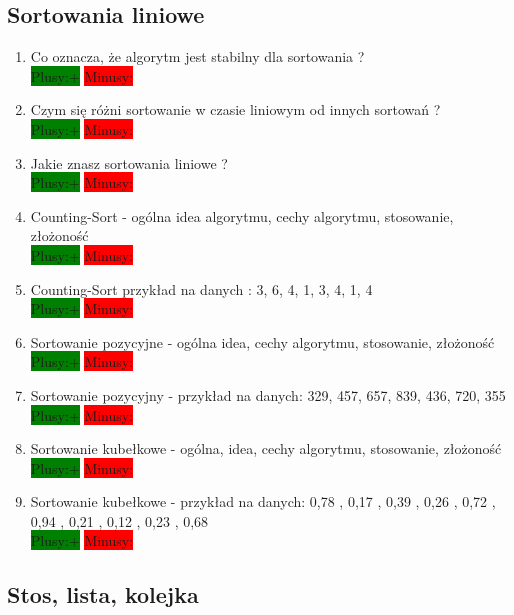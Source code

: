 \documentclass[a4paper,11pt]{article}
\begin{document}
\subsection{Sortowania liniowe}
\begin{enumerate}
\item Co oznacza, że algorytm jest stabilny dla sortowania ? \\ \colorbox{green}{Plusy:+} \colorbox{red}{Minusy: }

\item Czym się różni sortowanie w czasie liniowym od innych sortowań ? \\ 
\colorbox{green}{Plusy:+} \colorbox{red}{Minusy: }

\item Jakie znasz sortowania liniowe ? \\ 
\colorbox{green}{Plusy:+} \colorbox{red}{Minusy: }

\item Counting-Sort - ogólna idea algorytmu, cechy algorytmu, stosowanie, złożoność \\ 
\colorbox{green}{Plusy:+} \colorbox{red}{Minusy: }

\item Counting-Sort przykład na danych : 3, 6, 4, 1, 3, 4, 1, 4\\ \colorbox{green}{Plusy:+} \colorbox{red}{Minusy: }

\item Sortowanie pozycyjne - ogólna idea, cechy algorytmu, stosowanie, złożoność \\ 
\colorbox{green}{Plusy:+} \colorbox{red}{Minusy: }

\item Sortowanie pozycyjny - przykład na danych: 329, 457, 657, 839, 436, 720, 355 
\\ \colorbox{green}{Plusy:+} \colorbox{red}{Minusy: }

\item Sortowanie kubełkowe - ogólna, idea, cechy algorytmu, stosowanie, złożoność \\ 
\colorbox{green}{Plusy:+} \colorbox{red}{Minusy: }

\item Sortowanie kubełkowe - przykład na danych: 0,78 , 0,17 , 0,39 , 0,26 , 0,72 , 0,94 , 0,21 , 0,12 , 0,23 , 0,68 
\\ \colorbox{green}{Plusy:+} \colorbox{red}{Minusy: }

\end{enumerate}
\subsection{Stos, lista, kolejka}
\end{document}
